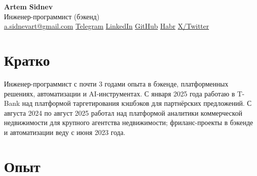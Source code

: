 \documentclass[10pt,a4paper]{article}
\begin{document}
\small

\begin{center}
{\LARGE \textbf{Artem Sidnev}}\\[0.20em]
{\normalsize Инженер-программист (бэкенд)}\\[0.35em]
{\footnotesize
\href{mailto:a.sidnevart@gmail.com}{a.sidnevart@gmail.com}
\enspace\textbar\enspace
\href{https://t.me/sidnevart}{Telegram}
\enspace\textbar\enspace
\href{https://www.linkedin.com/in/artem-sidnev}{LinkedIn}
\enspace\textbar\enspace
\href{https://github.com/sidnevart}{GitHub}
\enspace\textbar\enspace
\href{https://habr.com/ru/users/sidnevart/}{Habr}
\enspace\textbar\enspace
\href{https://x.com/ArtemkaWeb3}{X/Twitter}
}
\end{center}

\vspace{0.06em}

\section*{Кратко}
Инженер-программист с почти 3 годами опыта в бэкенде, платформенных решениях, автоматизации и AI-инструментах. С января 2025 года работаю в T-Bank над платформой таргетирования кэшбэков для партнёрских предложений. С августа 2024 по август 2025 работал над платформой аналитики коммерческой недвижимости для крупного агентства недвижимости; фриланс-проекты в бэкенде и автоматизации веду с июня 2023 года.

\section*{Опыт}
\end{document}

